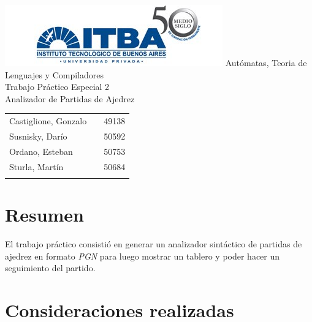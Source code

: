 \documentclass[a4paper,10pt]{article}
\begin{document}
\begin{titlepage}
	\thispagestyle{empty}
	\begin{center}
		\includegraphics[scale=0.7]{./images/itba.jpg}
		\vfill
		\Huge{Autómatas, Teoria de Lenguajes y Compiladores}\\
		\vspace{1cm}
		\huge{Trabajo Práctico Especial 2} \\
		\vspace{0.3cm}
		\huge{Analizador de Partidas de Ajedrez}
	\end{center}
	\vspace{2cm}
	\large{
		\begin{tabular}{lcr}
			Castiglione, Gonzalo & & 49138 \\
			Susnisky, Darío & & 50592 \\
			Ordano, Esteban & & 50753 \\
			Sturla, Martín & & 50684 \\
			\\ 
		\end{tabular}
	}
	\vfill
	\flushright{\today}
\end{titlepage}

\newpage


	\thispagestyle{empty}
\tableofcontents

\newpage

\setcounter{page}{1}

\newpage

\section{Resumen}
El trabajo práctico consistió en generar un analizador sintáctico de partidas de ajedrez en formato \textit{PGN} 
para luego mostrar un tablero y poder hacer un seguimiento del partido.
\newpage

\section{Consideraciones realizadas}
\end{document}

